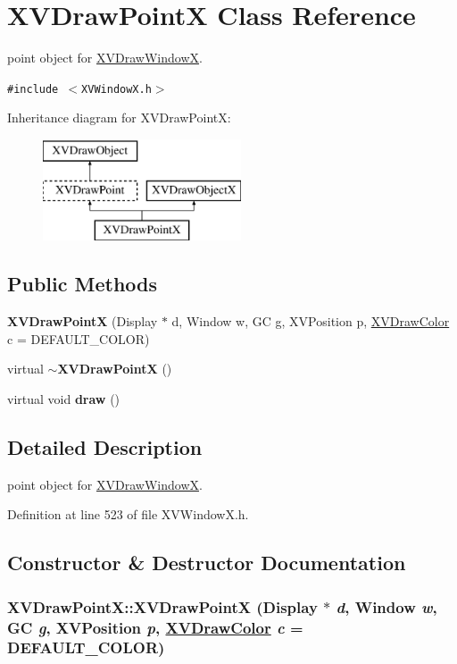 \hypertarget{class_XVDrawPointX}{
\section{XVDraw\-Point\-X  Class Reference}
\label{XVDrawPointX}
}
point object for \hyperlink{class_XVDrawWindowX}{XVDraw\-Window\-X}. 


{\tt \#include $<$XVWindow\-X.h$>$}

Inheritance diagram for XVDraw\-Point\-X:\begin{figure}[H]
\begin{center}
\leavevmode
\includegraphics[height=3cm]{class_XVDrawPointX}
\end{center}
\end{figure}
\subsection*{Public Methods}
\begin{CompactItemize}
\item 
{\bf XVDraw\-Point\-X} (Display $\ast$ d, Window w, GC g, XVPosition p, \hyperlink{class_XVDrawColor}{XVDraw\-Color} c = DEFAULT\_\-COLOR)
\item 
virtual {\bf $\sim$XVDraw\-Point\-X} ()
\item 
virtual void {\bf draw} ()
\end{CompactItemize}


\subsection{Detailed Description}
point object for \hyperlink{class_XVDrawWindowX}{XVDraw\-Window\-X}.





Definition at line 523 of file XVWindow\-X.h.

\subsection{Constructor \& Destructor Documentation}
\label{XVDrawPointX_a0}
\hypertarget{class_XVDrawPointX_a0}{
\subsubsection[XVDrawPointX]{\setlength{\rightskip}{0pt plus 5cm}XVDraw\-Point\-X::XVDraw\-Point\-X (Display $\ast$ {\em d}, Window {\em w}, GC {\em g}, XVPosition {\em p}, \hyperlink{class_XVDrawColor}{XVDraw\-Color} {\em c} = DEFAULT\_\-COLOR)}}




